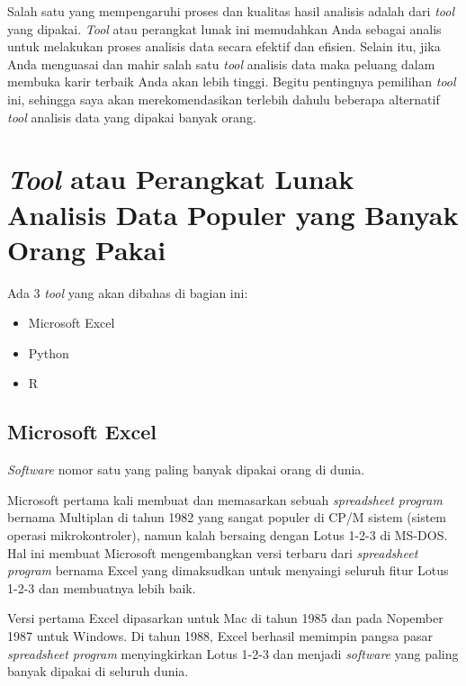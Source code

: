 \documentclass[openany]{book}
\providecommand{\tightlist}{%
  \setlength{\itemsep}{0pt}\setlength{\parskip}{0pt}}
\begin{document}
Salah satu yang mempengaruhi proses dan kualitas hasil analisis adalah
dari \emph{tool} yang dipakai. \emph{Tool} atau perangkat lunak ini
memudahkan Anda sebagai analis untuk melakukan proses analisis data
secara efektif dan efisien. Selain itu, jika Anda menguasai dan mahir
salah satu \emph{tool} analisis data maka peluang dalam membuka karir
terbaik Anda akan lebih tinggi. Begitu pentingnya pemilihan \emph{tool}
ini, sehingga saya akan merekomendasikan terlebih dahulu beberapa
alternatif \emph{tool} analisis data yang dipakai banyak orang.

\section{\texorpdfstring{\emph{Tool} atau Perangkat Lunak Analisis Data
Populer yang Banyak Orang
Pakai}{Tool atau Perangkat Lunak Analisis Data Populer yang Banyak Orang Pakai}}\label{tool-atau-perangkat-lunak-analisis-data-populer-yang-banyak-orang-pakai}

Ada 3 \emph{tool} yang akan dibahas di bagian ini:

\begin{itemize}
\tightlist
\item
  Microsoft Excel
\item
  Python
\item
  R
\end{itemize}

\subsection{Microsoft Excel}\label{microsoft-excel}

\emph{Software} nomor satu yang paling banyak dipakai orang di dunia.

Microsoft pertama kali membuat dan memasarkan sebuah \emph{spreadsheet
program} bernama Multiplan di tahun 1982 yang sangat populer di CP/M
sistem (sistem operasi mikrokontroler), namun kalah bersaing dengan
Lotus 1-2-3 di MS-DOS. Hal ini membuat Microsoft mengembangkan versi
terbaru dari \emph{spreadsheet program} bernama Excel yang dimaksudkan
untuk menyaingi seluruh fitur Lotus 1-2-3 dan membuatnya lebih baik.

Versi pertama Excel dipasarkan untuk Mac di tahun 1985 dan pada Nopember
1987 untuk Windows. Di tahun 1988, Excel berhasil memimpin pangsa pasar
\emph{spreadsheet program} menyingkirkan Lotus 1-2-3 dan menjadi
\emph{software} yang paling banyak dipakai di seluruh dunia.
\end{document}
